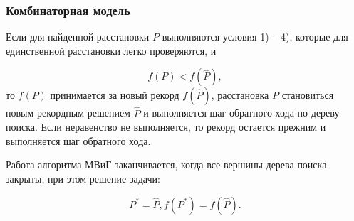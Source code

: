 \begin{frame}
    \fontsize{8pt}{7.2}\selectfont
    \frametitle{Комбинаторная модель}
    \justifying
    Если для найденной расстановки $P$ выполняются условия 1) – 4), которые для единственной расстановки легко проверяются, и

    \begin{displaymath}
        f(P) < f(\widehat{P}),
    \end{displaymath}
    то $f(P)$ принимается за новый рекорд $f(\widehat{P})$, расстановка $P$ становиться новым рекордным решением $\widehat{P}$ и выполняется шаг обратного хода по дереву поиска. Если неравенство не выполняется, то рекорд остается прежним и выполняется шаг обратного хода.

    \bigskip
    Работа алгоритма МВиГ заканчивается, когда все вершины дерева поиска закрыты, при этом решение задачи: 

    \begin{displaymath}
        P^{*} = \widehat{P},  f(P^*) = f(\widehat{P}).
    \end{displaymath}

    \bigskip
    \bigskip
\end{frame}

